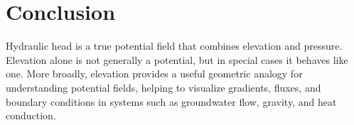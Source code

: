 \documentclass[11pt]{article}
\begin{document}
\section{Conclusion}

Hydraulic head is a true potential field that combines elevation and pressure. Elevation alone is not generally a potential, but in special cases it behaves like one. More broadly, elevation provides a useful geometric analogy for understanding potential fields, helping to visualize gradients, fluxes, and boundary conditions in systems such as groundwater flow, gravity, and heat conduction.
\end{document}
